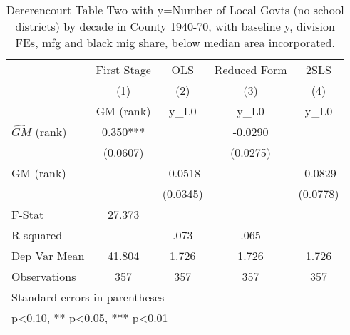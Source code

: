 \begin{table}[htbp]\centering
\def\sym#1{\ifmmode^{#1}\else\(^{#1}\)\fi}
\caption{Dererencourt Table Two with y=Number of Local Govts (no school districts) by decade in County 1940-70, with baseline y, division FEs, mfg and black mig share, below median area incorporated.}
\begin{tabular}{l*{4}{c}}
\toprule
                    & First Stage   &         OLS   &Reduced Form   &        2SLS   \\
                    &\multicolumn{1}{c}{(1)}&\multicolumn{1}{c}{(2)}&\multicolumn{1}{c}{(3)}&\multicolumn{1}{c}{(4)}\\
                    &\multicolumn{1}{c}{GM  (rank)}&\multicolumn{1}{c}{y\_L0}&\multicolumn{1}{c}{y\_L0}&\multicolumn{1}{c}{y\_L0}\\
\midrule
$\hat{GM}$ (rank)   &       0.350***&               &     -0.0290   &               \\
                    &    (0.0607)   &               &    (0.0275)   &               \\
\addlinespace
GM  (rank)          &               &     -0.0518   &               &     -0.0829   \\
                    &               &    (0.0345)   &               &    (0.0778)   \\
\midrule
F-Stat              &      27.373   &               &               &               \\
R-squared           &               &        .073   &        .065   &               \\
Dep Var Mean        &      41.804   &       1.726   &       1.726   &       1.726   \\
Observations        &         357   &         357   &         357   &         357   \\
\bottomrule
\multicolumn{5}{l}{\footnotesize Standard errors in parentheses}\\
\multicolumn{5}{l}{\footnotesize * p<0.10, ** p<0.05, *** p<0.01}\\
\end{tabular}
\end{table}
